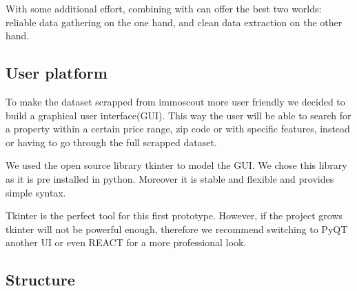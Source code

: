 \documentclass[main]{subfiles}
\begin{document}
With some additional effort, combining \selenium with \scrapy can offer the best two worlds: reliable data gathering on the one hand,
and clean data extraction on the other hand.




\subsection{User platform}
To make the dataset scrapped from immoscout more user friendly we decided to build a graphical user interface(GUI).
This way the user will be able to search for a property within a certain price range, zip code or with specific features, 
instead or having to go through the full scrapped dataset.\par
We used the open source library tkinter to model the GUI. We chose this library as it is pre installed in python.
Moreover it is stable and flexible and provides simple syntax.\par
Tkinter is the perfect tool for this first prototype. However, if the project grows tkinter will not be powerful enough,
therefore we recommend switching to PyQT another UI or even REACT for a more professional look. 


\subsection{Structure}
\end{document}
